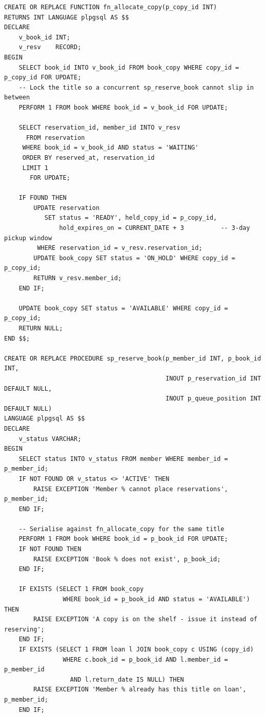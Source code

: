 \documentclass[11pt,a4paper]{report}
\begin{document}
\begin{lstlisting}[caption={Queue allocation and reservation procedures}, label={lst:resv}]
CREATE OR REPLACE FUNCTION fn_allocate_copy(p_copy_id INT)
RETURNS INT LANGUAGE plpgsql AS $$
DECLARE
    v_book_id INT;
    v_resv    RECORD;
BEGIN
    SELECT book_id INTO v_book_id FROM book_copy WHERE copy_id = p_copy_id FOR UPDATE;
    -- Lock the title so a concurrent sp_reserve_book cannot slip in between
    PERFORM 1 FROM book WHERE book_id = v_book_id FOR UPDATE;

    SELECT reservation_id, member_id INTO v_resv
      FROM reservation
     WHERE book_id = v_book_id AND status = 'WAITING'
     ORDER BY reserved_at, reservation_id
     LIMIT 1
       FOR UPDATE;

    IF FOUND THEN
        UPDATE reservation
           SET status = 'READY', held_copy_id = p_copy_id,
               hold_expires_on = CURRENT_DATE + 3          -- 3-day pickup window
         WHERE reservation_id = v_resv.reservation_id;
        UPDATE book_copy SET status = 'ON_HOLD' WHERE copy_id = p_copy_id;
        RETURN v_resv.member_id;
    END IF;

    UPDATE book_copy SET status = 'AVAILABLE' WHERE copy_id = p_copy_id;
    RETURN NULL;
END $$;

CREATE OR REPLACE PROCEDURE sp_reserve_book(p_member_id INT, p_book_id INT,
                                            INOUT p_reservation_id INT DEFAULT NULL,
                                            INOUT p_queue_position INT DEFAULT NULL)
LANGUAGE plpgsql AS $$
DECLARE
    v_status VARCHAR;
BEGIN
    SELECT status INTO v_status FROM member WHERE member_id = p_member_id;
    IF NOT FOUND OR v_status <> 'ACTIVE' THEN
        RAISE EXCEPTION 'Member % cannot place reservations', p_member_id;
    END IF;

    -- Serialise against fn_allocate_copy for the same title
    PERFORM 1 FROM book WHERE book_id = p_book_id FOR UPDATE;
    IF NOT FOUND THEN
        RAISE EXCEPTION 'Book % does not exist', p_book_id;
    END IF;

    IF EXISTS (SELECT 1 FROM book_copy
                WHERE book_id = p_book_id AND status = 'AVAILABLE') THEN
        RAISE EXCEPTION 'A copy is on the shelf - issue it instead of reserving';
    END IF;
    IF EXISTS (SELECT 1 FROM loan l JOIN book_copy c USING (copy_id)
                WHERE c.book_id = p_book_id AND l.member_id = p_member_id
                  AND l.return_date IS NULL) THEN
        RAISE EXCEPTION 'Member % already has this title on loan', p_member_id;
    END IF;


\end{lstlisting}
\end{document}
